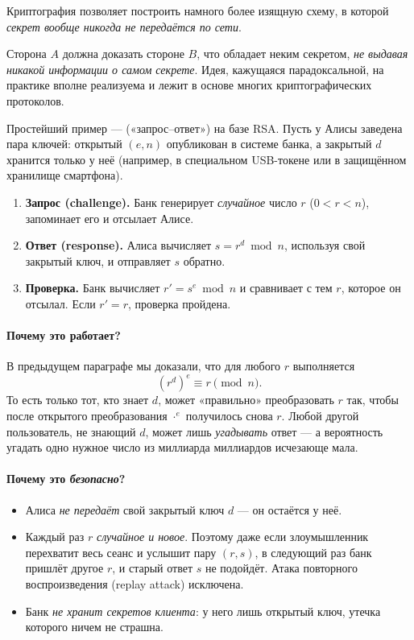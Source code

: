 Криптография позволяет построить намного более изящную схему, в которой \emph{секрет вообще никогда не передаётся по сети}.

\begin{importantbox}[title={Важно: принцип «доказательства с нулевым разглашением»}]
Сторона $A$ должна доказать стороне $B$, что обладает неким секретом, \emph{не выдавая никакой информации о самом секрете}. Идея, кажущаяся парадоксальной, на практике вполне реализуема и лежит в основе многих криптографических протоколов.
\end{importantbox}

Простейший пример ---  («запрос--ответ») на базе RSA. Пусть у Алисы заведена пара ключей: открытый $(e, n)$ опубликован в системе банка, а закрытый $d$ хранится только у неё (например, в специальном USB-токене или в защищённом хранилище смартфона).

\begin{algorithmbox}[title={Алгоритм: аутентификация через RSA}]
\begin{enumerate}
  \item \textbf{Запрос (challenge).} Банк генерирует \emph{случайное} число $r$ ($0 < r < n$), запоминает его и отсылает Алисе.
  \item \textbf{Ответ (response).} Алиса вычисляет $s = r^{d} \bmod n$, используя свой закрытый ключ, и отправляет $s$ обратно.
  \item \textbf{Проверка.} Банк вычисляет $r' = s^{e} \bmod n$ и сравнивает с тем $r$, которое он отсылал. Если $r' = r$, проверка пройдена.
\end{enumerate}
\end{algorithmbox}

\paragraph*{Почему это работает?} В предыдущем параграфе мы доказали, что для любого $r$ выполняется
\[
  (r^{d})^{e} \equiv r \pmod n.
\]
То есть только тот, кто знает $d$, может «правильно» преобразовать $r$ так, чтобы после открытого преобразования $\cdot^{e}$ получилось снова $r$. Любой другой пользователь, не знающий $d$, может лишь \emph{угадывать} ответ --- а вероятность угадать одно нужное число из миллиарда миллиардов исчезающе мала.

\paragraph*{Почему это \emph{безопасно}?}
\begin{itemize}
  \item Алиса \emph{не передаёт} свой закрытый ключ $d$ --- он остаётся у неё.
  \item Каждый раз $r$ \emph{случайное и новое}. Поэтому даже если злоумышленник перехватит весь сеанс и услышит пару $(r, s)$, в следующий раз банк пришлёт другое $r$, и старый ответ $s$ не подойдёт. Атака повторного воспроизведения (replay attack) исключена.
  \item Банк \emph{не хранит секретов клиента}: у него лишь открытый ключ, утечка которого ничем не страшна.
\end{itemize}

